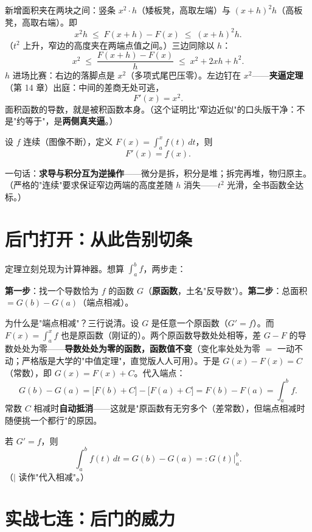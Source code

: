 新增面积夹在两块之间：竖条 $x^2\cdot h$（矮板凳，高取左端）与 $ (x+h)^2 h$（高板凳，高取右端）。即
\[
x^2 h \;\le\; F(x+h) - F(x) \;\le\; (x+h)^2 h .
\]
（$t^2$ 上升，窄边的高度夹在两端点值之间。）三边同除以 $h$：
\[
x^2 \;\le\; \frac{F(x+h)-F(x)}{h} \;\le\; x^2 + 2xh + h^2 .
\]
$h$ 进场比赛：右边的落脚点是 $x^2$（多项式尾巴压零）。左边钉在 $x^2$——\textbf{夹逼定理}（第 14 章）出庭：中间的差商无处可逃，
\[
F'(x) = x^2 .
\]
面积函数的导数，就是被积函数本身。（这个证明比"窄边近似"的口头版干净：不是"约等于"，是\textbf{两侧真夹逼}。）

\begin{dingli}
设 $f$ 连续（图像不断），定义 $F(x) = \displaystyle\int_a^x f(t)\,dt$，则
\[
F'(x) = f(x).
\]
\end{dingli}

一句话：\textbf{求导与积分互为逆操作}——微分是拆，积分是堆；拆完再堆，物归原主。（严格的"连续"要求保证窄边两端的高度差随 $h$ 消失——$t^2$ 光滑，全书函数全达标。）

\section{后门打开：从此告别切条}

定理立刻兑现为计算神器。想算 $\int_a^b f$，两步走：

\textbf{第一步}：找一个导数恰为 $f$ 的函数 $G$（\textbf{原函数}，土名"反导数"）。\textbf{第二步}：总面积 $= G(b) - G(a)$（端点相减）。

为什么是"端点相减"？三行说清。设 $G$ 是任意一个原函数（$G' = f$）。而 $F(x) = \int_a^x f$ 也是原函数（刚证的）。两个原函数导数处处相等，差 $G - F$ 的导数处处为零——\textbf{导数处处为零的函数，函数值不变}（变化率处处为零 $=$ 一动不动；严格版是大学的"中值定理"，直觉版人人可用）。于是 $G(x) - F(x) = C$（常数），即 $G(x) = F(x) + C$。代入端点：
\[
G(b) - G(a) = \big[F(b) + C\big] - \big[F(a) + C\big] = F(b) - F(a) = \int_a^b f .
\]
常数 $C$ 相减时\textbf{自动抵消}——这就是"原函数有无穷多个（差常数），但端点相减时随便挑一个都行"的原因。

\begin{dingli}
若 $G' = f$，则
\[
\int_a^b f(t)\,dt = G(b) - G(a) =: G(t)\Big|_a^b .
\]
（$\Big|$ 读作"代入相减"。）
\end{dingli}

\section{实战七连：后门的威力}

